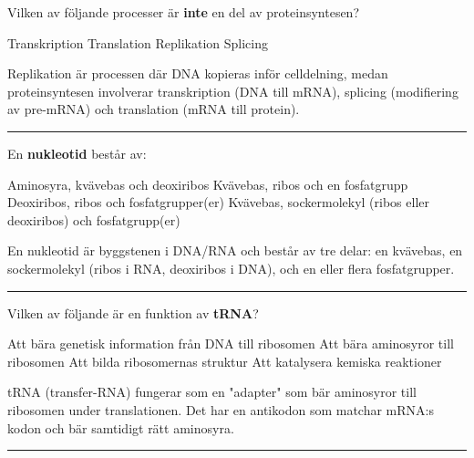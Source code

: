 \documentclass{exam}
\begin{document}
\begin{questions}

\question Vilken av följande processer är \textbf{inte} en del av proteinsyntesen?
\begin{checkboxes}
    \choice Transkription
    \choice Translation
    \correctchoice Replikation
    \choice Splicing
\end{checkboxes}
\begin{solution}
Replikation är processen där DNA kopieras inför celldelning, medan proteinsyntesen involverar transkription (DNA till mRNA), splicing (modifiering av pre-mRNA) och translation (mRNA till protein).
\end{solution}

\vspace{5mm}
\hrule
\vspace{5mm}

\question En \textbf{nukleotid} består av:
\begin{checkboxes}
   \choice Aminosyra, kvävebas och deoxiribos
   \choice Kvävebas, ribos och en fosfatgrupp
   \choice Deoxiribos, ribos och fosfatgrupper(er)
   \correctchoice Kvävebas, sockermolekyl (ribos eller deoxiribos) och fosfatgrupp(er)
\end{checkboxes} 
\begin{solution}
En nukleotid är byggstenen i DNA/RNA och består av tre delar: en kvävebas, en sockermolekyl (ribos i RNA, deoxiribos i DNA), och en eller flera fosfatgrupper.
\end{solution}

\vspace{5mm}
\hrule
\vspace{5mm}

\question Vilken av följande är en funktion av \textbf{tRNA}?
\begin{checkboxes}
\choice Att bära genetisk information från DNA till ribosomen
\correctchoice Att bära aminosyror till ribosomen
\choice Att bilda ribosomernas struktur
\choice Att katalysera kemiska reaktioner
\end{checkboxes}
\begin{solution}
tRNA (transfer-RNA) fungerar som en "adapter" som bär aminosyror till ribosomen under translationen. Det har en antikodon som matchar mRNA:s kodon och bär samtidigt rätt aminosyra.
\end{solution}

\vspace{5mm}
\hrule
\vspace{5mm}


\end{questions}
\end{document}
